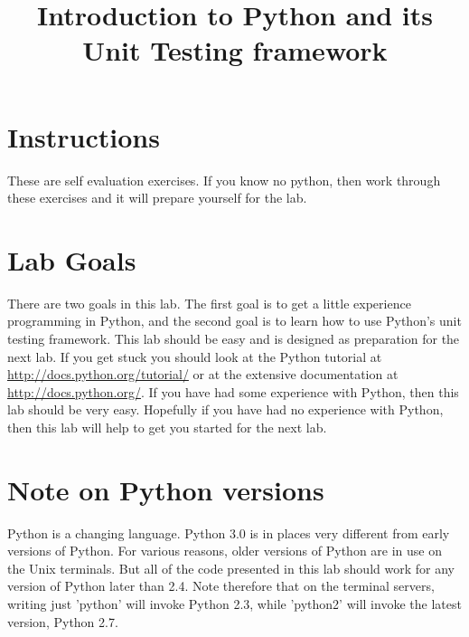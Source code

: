 \documentclass{paper}
\title{Introduction to Python and its Unit Testing framework}
\begin{document}
\maketitle
\section*{Instructions}
These are self evaluation exercises. If you know no python, then work through
these exercises and it will prepare yourself for the lab.
\section*{Lab Goals}
There are two goals in this lab. The first goal is to get a little experience
programming in Python, and the second goal is to learn how to use Python's unit
testing framework. This lab should be easy and is designed as preparation for
the next lab. If you get stuck you should look at the Python tutorial at
\url{http://docs.python.org/tutorial/} or at the extensive documentation at
\url{http://docs.python.org/}. If you have had some experience with Python,
then this lab should be very easy. Hopefully if you have had no experience
with Python, then this lab will help to get you started for the next lab.
\section*{Note on Python versions}
Python is a changing language. Python 3.0 is in places very different
from early versions of Python. For various reasons, older versions of
Python are in use on the Unix terminals. But all of the code presented in
this lab should work for any version of Python later than 2.4.
Note therefore that on the terminal servers, writing just 'python' will invoke Python 2.3,
while 'python2' will invoke the latest version, Python 2.7.
\newpage
\end{document}
